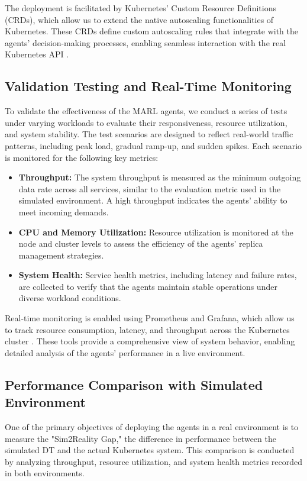 \documentclass[conference]{IEEEtran}
\begin{document}
The deployment is facilitated by Kubernetes' Custom Resource Definitions (CRDs), which allow us to extend the native autoscaling functionalities of Kubernetes. These CRDs define custom autoscaling rules that integrate with the agents' decision-making processes, enabling seamless interaction with the real Kubernetes API \cite{rosenberg_k8s_autoscaling}.

\subsection{Validation Testing and Real-Time Monitoring}

To validate the effectiveness of the MARL agents, we conduct a series of tests under varying workloads to evaluate their responsiveness, resource utilization, and system stability. The test scenarios are designed to reflect real-world traffic patterns, including peak load, gradual ramp-up, and sudden spikes. Each scenario is monitored for the following key metrics:
\begin{itemize}
    \item \textbf{Throughput:} The system throughput is measured as the minimum outgoing data rate across all services, similar to the evaluation metric used in the simulated environment. A high throughput indicates the agents' ability to meet incoming demands.
    \item \textbf{CPU and Memory Utilization:} Resource utilization is monitored at the node and cluster levels to assess the efficiency of the agents' replica management strategies.
    \item \textbf{System Health:} Service health metrics, including latency and failure rates, are collected to verify that the agents maintain stable operations under diverse workload conditions.
\end{itemize}

Real-time monitoring is enabled using Prometheus and Grafana, which allow us to track resource consumption, latency, and throughput across the Kubernetes cluster \cite{prometheus_grafana}. These tools provide a comprehensive view of system behavior, enabling detailed analysis of the agents’ performance in a live environment.

\subsection{Performance Comparison with Simulated Environment}

One of the primary objectives of deploying the agents in a real environment is to measure the "Sim2Reality Gap," the difference in performance between the simulated DT and the actual Kubernetes system. This comparison is conducted by analyzing throughput, resource utilization, and system health metrics recorded in both environments. 
\end{document}
